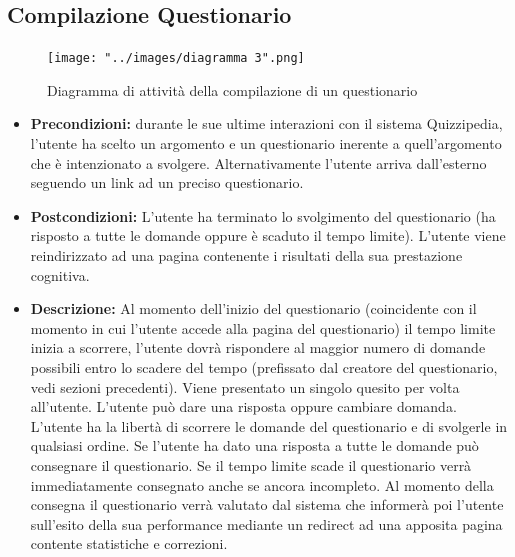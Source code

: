 \rigaregistro{0.0.17}{Luca Alessio (Progettista)}{12/05/2016}{Termine stesura sezione diagrammi e revisione/ampliamento di vari paragrafi}\documentclass[a4paper,11pt]{article}
\begin{document}
\subsection{Compilazione Questionario}
\begin{figure}[h!]
\begin{center}
	\texttt{[image: "../images/diagramma 3".png]}
	\caption{Diagramma di attività della compilazione di un questionario}
\end{center}
\end{figure}
\begin{itemize}
\item\textbf{Precondizioni:} durante le sue ultime interazioni con il sistema Quizzipedia, l'utente ha scelto un argomento e un questionario inerente a quell'argomento che è intenzionato a svolgere. Alternativamente l'utente arriva dall'esterno seguendo un link ad un preciso questionario.
\item\textbf{Postcondizioni:} L'utente ha terminato lo svolgimento del questionario (ha risposto a tutte le domande oppure è scaduto il tempo limite). L'utente viene reindirizzato ad una pagina contenente i risultati della sua prestazione cognitiva.
\item\textbf{Descrizione:} Al momento dell'inizio del questionario (coincidente con il momento in cui l'utente accede alla pagina del questionario) il tempo limite inizia a scorrere, l'utente dovrà rispondere al maggior numero di domande possibili entro lo scadere del tempo (prefissato dal creatore del questionario, vedi sezioni precedenti). Viene presentato un singolo quesito per volta all'utente. L'utente può dare una risposta oppure cambiare domanda. L'utente ha la libertà di scorrere le domande del questionario e di svolgerle in qualsiasi ordine. Se l'utente ha dato una risposta a tutte le domande può consegnare il questionario. Se il tempo limite scade il questionario verrà immediatamente consegnato anche se ancora incompleto. Al momento della consegna il questionario verrà valutato dal sistema che informerà poi l'utente sull'esito della sua performance mediante un redirect ad una apposita pagina contente statistiche e correzioni.
\end{itemize}

\newpage
\end{document}
